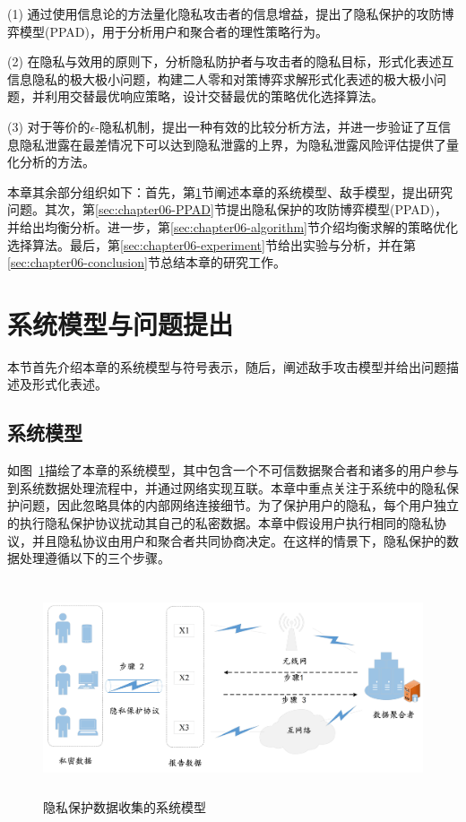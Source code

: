 (1) 通过使用信息论的方法量化隐私攻击者的信息增益，提出了隐私保护的攻防博弈模型(PPAD)，用于分析用户和聚合者的理性策略行为。
	
(2) 在隐私与效用的原则下，分析隐私防护者与攻击者的隐私目标，形式化表述互信息隐私的极大极小问题，构建二人零和对策博弈求解形式化表述的极大极小问题，并利用交替最优响应策略，设计交替最优的策略优化选择算法。
	
(3) 对于等价的$\epsilon$-隐私机制，提出一种有效的比较分析方法，并进一步验证了互信息隐私泄露在最差情况下可以达到隐私泄露的上界，为隐私泄露风险评估提供了量化分析的方法。


本章其余部分组织如下：首先，第\ref{sec:chapter06-system-model}节阐述本章的系统模型、敌手模型，提出研究问题。其次，第\ref{sec:chapter06-PPAD}节提出隐私保护的攻防博弈模型(PPAD)，并给出均衡分析。进一步，第\ref{sec:chapter06-algorithm}节介绍均衡求解的策略优化选择算法。最后，第\ref{sec:chapter06-experiment}节给出实验与分析，并在第\ref{sec:chapter06-conclusion}节总结本章的研究工作。

\section{系统模型与问题提出}\label{sec:chapter06-system-model}
本节首先介绍本章的系统模型与符号表示，随后，阐述敌手攻击模型并给出问题描述及形式化表述。
\subsection{系统模型}
如图~\ref{Fig:chapter07_architecture}描绘了本章的系统模型，其中包含一个不可信数据聚合者和诸多的用户参与到系统数据处理流程中，并通过网络实现互联。本章中重点关注于系统中的隐私保护问题，因此忽略具体的内部网络连接细节。为了保护用户的隐私，每个用户独立的执行隐私保护协议扰动其自己的私密数据。本章中假设用户执行相同的隐私协议，并且隐私协议由用户和聚合者共同协商决定。在这样的情景下，隐私保护的数据处理遵循以下的三个步骤。
\begin{figure}[!ht]
	\centering \includegraphics[width=5.5in,height=2.5in]{./figures/Application_architecture.jpg}
	\caption{隐私保护数据收集的系统模型}
	\label{Fig:chapter07_architecture}
\end{figure}

